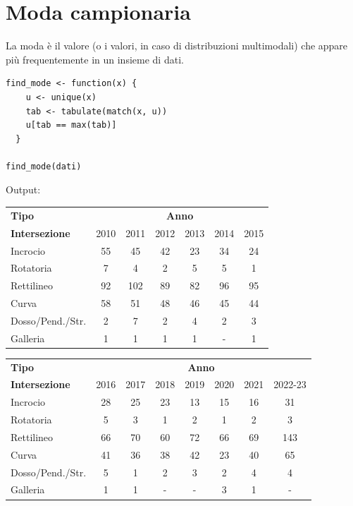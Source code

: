 \documentclass[14pt, openany, titlepage]{report} %
\begin{document}
\section{Moda campionaria}
La moda è il valore (o i valori, in caso di distribuzioni multimodali)
 che appare più frequentemente in un insieme di dati.
\begin{center}
\begin{lstlisting}[breaklines=true]
find_mode <- function(x) {
    u <- unique(x)
    tab <- tabulate(match(x, u))
    u[tab == max(tab)]
  }

find_mode(dati)
\end{lstlisting}  
\end{center}
\noindent
Output: 
\begin{table}[!ht]
\centering
\footnotesize
\centering
\begin{tabular}{|l|c|c|c|c|c|c|}
\hline
\textbf{Tipo} & \multicolumn{6}{c|}{\textbf{Anno}} \\ \cline{2-7}
\textbf{Intersezione} & 2010 & 2011 & 2012 & 2013 & 2014 & 2015 \\ \hline
Incrocio & 55 & 45 & 42 & 23 & 34 & 24 \\ \hline
Rotatoria & 7 & 4 & 2 & 5 & 5 & 1 \\ \hline
Rettilineo & 92 & 102 & 89 & 82 & 96 & 95 \\ \hline
Curva & 58 & 51 & 48 & 46 & 45 & 44 \\ \hline
Dosso/Pend./Str. & 2 & 7 & 2 & 4 & 2 & 3 \\ \hline
Galleria & 1 & 1 & 1 & 1 & - & 1 \\ \hline
\end{tabular}

\vspace{0.5cm}

\begin{tabular}{|l|c|c|c|c|c|c|c|}
\hline
\textbf{Tipo} & \multicolumn{7}{c|}{\textbf{Anno}} \\ \cline{2-8}
\textbf{Intersezione} & 2016 & 2017 & 2018 & 2019 & 2020 & 2021 & 2022-23 \\ \hline
Incrocio & 28 & 25 & 23 & 13 & 15 & 16 & 31 \\ \hline
Rotatoria & 5 & 3 & 1 & 2 & 1 & 2 & 3 \\ \hline
Rettilineo & 66 & 70 & 60 & 72 & 66 & 69 & 143 \\ \hline
Curva & 41 & 36 & 38 & 42 & 23 & 40 & 65 \\ \hline
Dosso/Pend./Str. & 5 & 1 & 2 & 3 & 2 & 4 & 4 \\ \hline
Galleria & 1 & 1 & - & - & 3 & 1 & - \\ \hline
\end{tabular}
\end{table}
\normalsize
\end{document}
